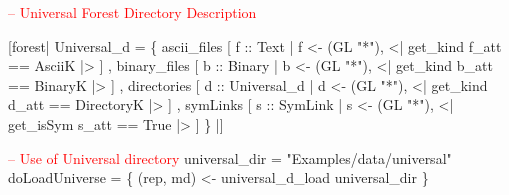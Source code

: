 \begin{code}
\textcolor{red}{-- Universal Forest Directory Description}

[forest| 
   Universal_d = 
     \{ ascii_files   [ f :: Text        | f <-  (GL "*"), <| get_kind  f_att == AsciiK     |> ]
     , binary_files  [ b :: Binary      | b <-  (GL "*"), <| get_kind  b_att == BinaryK    |> ]
     , directories   [ d :: Universal_d | d <-  (GL "*"), <| get_kind  d_att == DirectoryK |> ]
     , symLinks      [ s :: SymLink     | s <-  (GL "*"), <| get_isSym s_att == True       |> ]
     \} 
|]
\end{code}
\begin{code}

\textcolor{red}{-- Use of Universal directory}
universal_dir = "Examples/data/universal"
doLoadUniverse =  \{
 (rep, md) <-  universal_d_load  universal_dir
 \}
\end{code}

